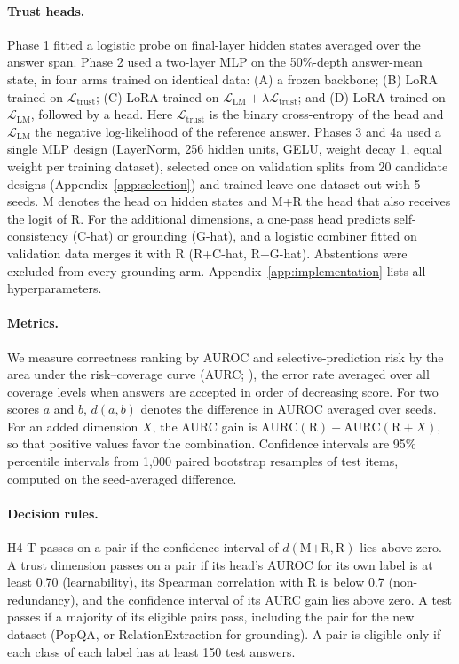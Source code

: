 \documentclass[10pt]{article}
\newcommand{\Ltrust}{\mathcal{L}_{\text{trust}}}
\newcommand{\LLM}{\mathcal{L}_{\text{LM}}}
\begin{document}
\paragraph{Trust heads.} Phase 1 fitted a logistic probe on final-layer hidden states averaged over the answer span. Phase 2 used a two-layer MLP on the 50\%-depth answer-mean state, in four arms trained on identical data: (A) a frozen backbone; (B) LoRA \citep{hu2022lora} trained on $\Ltrust$; (C) LoRA trained on $\LLM + \lambda\Ltrust$; and (D) LoRA trained on $\LLM$, followed by a head. Here $\Ltrust$ is the binary cross-entropy of the head and $\LLM$ the negative log-likelihood of the reference answer. Phases 3 and 4a used a single MLP design (LayerNorm, 256 hidden units, GELU, weight decay 1, equal weight per training dataset), selected once on validation splits from 20 candidate designs (Appendix~\ref{app:selection}) and trained leave-one-dataset-out with 5 seeds. M denotes the head on hidden states and M+R the head that also receives the logit of R. For the additional dimensions, a one-pass head predicts self-consistency (C-hat) or grounding (G-hat), and a logistic combiner fitted on validation data merges it with R (R+C-hat, R+G-hat). Abstentions were excluded from every grounding arm. Appendix~\ref{app:implementation} lists all hyperparameters.

\paragraph{Metrics.} We measure correctness ranking by AUROC and selective-prediction risk by the area under the risk--coverage curve (AURC; \citealp{geifman2017selective}), the error rate averaged over all coverage levels when answers are accepted in order of decreasing score. For two scores $a$ and $b$, $d(a,b)$ denotes the difference in AUROC averaged over seeds. For an added dimension $X$, the AURC gain is $\mathrm{AURC}(\mathrm{R}) - \mathrm{AURC}(\mathrm{R}{+}X)$, so that positive values favor the combination. Confidence intervals are 95\% percentile intervals from 1,000 paired bootstrap resamples of test items, computed on the seed-averaged difference.

\paragraph{Decision rules.} H4-T passes on a pair if the confidence interval of $d(\text{M+R}, \text{R})$ lies above zero. A trust dimension passes on a pair if its head's AUROC for its own label is at least 0.70 (learnability), its Spearman correlation with R is below 0.7 (non-redundancy), and the confidence interval of its AURC gain lies above zero. A test passes if a majority of its eligible pairs pass, including the pair for the new dataset (PopQA, or RelationExtraction for grounding). A pair is eligible only if each class of each label has at least 150 test answers.
\end{document}
